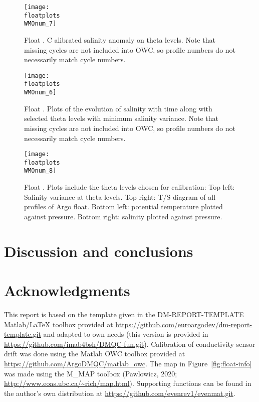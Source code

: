 \documentclass{article}
\begin{document}
\begin{figure}[p]
    \centering    
    \texttt{[image: \\floatplots\\WMOnum\_7]}
    \caption{Float \WMOnum.  C alibrated salinity anomaly on theta levels.
      Note that missing cycles are not included into OWC, so profile numbers do
      not necessarily match cycle numbers.}
    \label{CalibSalAnomOnTheta}
\end{figure}
\begin{figure}[p]
    \centering    
    \texttt{[image: \\floatplots\\WMOnum\_6]}
    \caption{Float \WMOnum. Plots of the evolution of salinity with time
      along with selected theta levels with minimum salinity variance.
      Note that missing cycles are not included into OWC, so profile numbers do
      not necessarily match cycle numbers.} 
    \label{SalErrOnTheta}
\end{figure}
\begin{figure}[p]
  \centerline{\texttt{[image: \\floatplots\\WMOnum\_8]}}
  \caption{Float \WMOnum. Plots include the theta levels chosen for
    calibration: Top left: Salinity variance at theta levels. Top right:
    T/S diagram of all profiles of Argo float. Bottom left: potential
    temperature plotted against pressure. Bottom right: salinity plotted
    against pressure.} 
  \label{Salinity_OWlevels}
\end{figure}




\FloatBarrier
\newpage
\section{Discussion and conclusions}\label{sec:discussion}






\section*{Acknowledgments}
This report is based on the template given in the DM-REPORT-TEMPLATE
Matlab/LaTeX toolbox provided at
\href{url}{https://github.com/euroargodev/dm-report-template.git} and
adapted to own needs (this version is provided in
\href{url}{https://github.com/imab4bsh/DMQC-fun.git}).  
%
Calibration of conductivity sensor drift was done using the Matlab OWC
toolbox provided at \href{url}{https://github.com/ArgoDMQC/matlab\_owc}.
%
The map in Figure~\ref{fig:float-info} was made using the M\_MAP toolbox
(Pawlowicz, 2020; \url{http://www.eoas.ubc.ca/~rich/map.html}).
%
Supporting functions can be found in the author's own distribution at
\href{url}{https://github.com/evenrev1/evenmat.git}.
\end{document}
